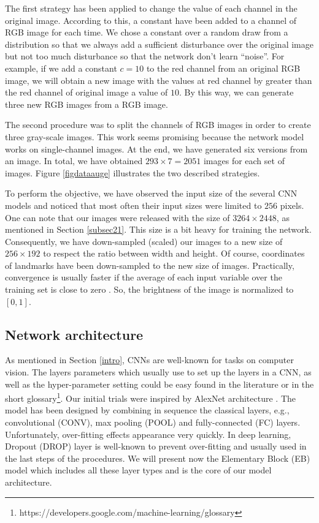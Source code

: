 \documentclass[review]{elsarticle}
\begin{document}
The first strategy has been applied to change the value of each channel in the original image. According to this, a constant have been added to a channel of RGB image for each time. We chose a constant over a random draw from a distribution so that we always add a sufficient disturbance over the original image but not too much disturbance so that the network don’t learn ``noise''. For example, if we add a constant $c = 10$ to the red channel from an original RGB image, we will obtain a new image with the values at red channel by greater than the red channel of original image a value of $10$. By this way, we can generate three new RGB images from a RGB image.

The second procedure was to split the channels of RGB images in order to create three gray-scale images. This work seems promising because the network model works on single-channel images. At the end, we have generated six versions from an image. In total, we have obtained $293 \times 7 = 2051$ images for each set of images. Figure \ref{figdataauge} illustrates the two described strategies.

To perform the objective, we have observed the input size of the several CNN models \cite{krizhevsky2012imagenet, ciregan2012multi, cintas2016automatic, sun2013deep} and noticed that most often their input sizes were limited to $256$ pixels. One can note that our images were released with the size of $3264 \times 2448$, as mentioned in Section \ref{subsec21}. This size is a bit heavy for training the network. Consequently, we have down-sampled (scaled) our images to a new size of $256 \times 192$ to respect the ratio between width and height. Of course, coordinates of landmarks have been down-sampled to the new size of images. Practically, convergence is usually faster if the average of each input variable over the training set is close to zero \cite{lecun2012efficient}. So, the brightness of the image is normalized to $[0,1]$.%

\subsection{Network architecture}
\label{subsec22}
As mentioned in Section \ref{intro}, CNNs are well-known for tasks on computer vision. The layers parameters which usually use to set up the layers in a CNN, as well as the hyper-parameter setting could be easy found in the literature \cite{lecun2015deep, Goodfellow2016} or in the short glossary\footnote{https://developers.google.com/machine-learning/glossary}. Our initial trials were inspired by AlexNet architecture \cite{krizhevsky2012imagenet}. The model has been designed by combining in sequence the classical layers, e.g., convolutional (CONV), max pooling (POOL) and fully-connected (FC) layers. Unfortunately, over-fitting effects appearance very quickly. In deep learning, Dropout (DROP) layer is well-known to prevent over-fitting \cite{srivastava2014dropout} and usually used in the last steps of the procedures. We
will present now the Elementary Block (EB) model which includes all
these layer types and is the core of our model
architecture.
\end{document}
